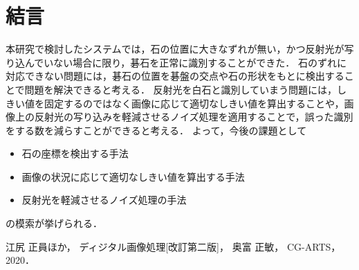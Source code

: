 \documentclass[summary]{nitocs}
\numberwithin{equation}{section}
\begin{document}
    \section{結言}\label{conclusion} %
        本研究で検討したシステムでは，石の位置に大きなずれが無い，かつ反射光が写り込んでいない場合に限り，碁石を正常に識別することができた．
        石のずれに対応できない問題には，碁石の位置を碁盤の交点や石の形状をもとに検出することで問題を解決できると考える．
        反射光を白石と識別していまう問題には，しきい値を固定するのではなく画像に応じて適切なしきい値を算出することや，画像上の反射光の写り込みを軽減させるノイズ処理を適用することで，誤った識別をする数を減らすことができると考える．
        よって，今後の課題として
        \begin{itemize}
            \item 石の座標を検出する手法
            \item 画像の状況に応じて適切なしきい値を算出する手法
            \item 反射光を軽減させるノイズ処理の手法
        \end{itemize}
        の模索が挙げられる．    

    \begin{thebibliography}{10}

        江尻 正員ほか，
        ディジタル画像処理[改訂第二版]，
        奥富 正敏，
        CG-ARTS，
        2020．
    \end{thebibliography}
\end{document}
